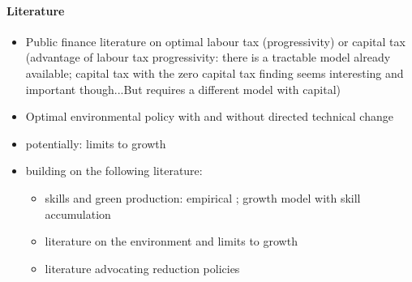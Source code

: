 \paragraph{Literature}
\begin{itemize}
\item Public finance literature on optimal labour tax (progressivity) or capital tax (advantage of labour tax progressivity: there is a tractable model already available; capital tax with the zero capital tax finding seems interesting and important though...But requires a different model with capital) \citep{Heathcote2017OptimalFramework, Conesa2009TaxingAll, Domeij2004OnTaxes}
\item Optimal environmental policy with and without directed technical change \citep{Acemoglu2012TheChange, Acemoglu2016TransitionTechnology, Fried2018ClimateAnalysis, Barrage2019OptimalPolicy, Golosov2014OptimalEquilibrium, Hassler2016EnvironmentalMacroeconomics}
\item potentially: limits to growth \citep{Stokey1998AreGrowth, Jones2016LifeGrowth, Arrow2004AreMuch}
\item building on the following literature: \begin{itemize}
\item skills and green production: empirical \citep{Consoli2016DoCapital, Bowen2018CharacterisingComposition, Borissov2019CarbonDevelopment}; growth model with skill accumulation \citep{Borissov2019CarbonDevelopment}
\item literature on the environment and limits to growth \citep{Dasgupta2021, Rockstrom2009AHumanity, Brock2005ChapterEmpirics, Arrow2004AreMuch, Cohen2019AnnualSubstitutable}
\item literature advocating reduction policies \citep{Schor2005SustainableReduction, Pullinger2014WorkingDesign}

\end{itemize}
\end{itemize}
